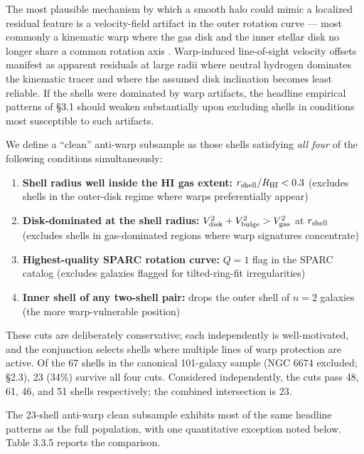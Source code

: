\documentclass[linenumbers,trackchanges]{aastex701}
\begin{document}
The most plausible mechanism by which a smooth halo could mimic a localized residual feature is a velocity-field artifact in the outer rotation curve --- most commonly a kinematic warp where the gas disk and the inner stellar disk no longer share a common rotation axis \citep{Briggs1990,Sancisi2008}. Warp-induced line-of-sight velocity offsets manifest as apparent residuals at large radii where neutral hydrogen dominates the kinematic tracer and where the assumed disk inclination becomes least reliable. If the shells were dominated by warp artifacts, the headline empirical patterns of \S3.1 should weaken substantially upon excluding shells in conditions most susceptible to such artifacts.

We define a ``clean'' anti-warp subsample as those shells satisfying \emph{all four} of the following conditions simultaneously:

\begin{enumerate}
  \item \textbf{Shell radius well inside the HI gas extent:} $r_{\rm shell} / R_{\rm HI} < 0.3$ (excludes shells in the outer-disk regime where warps preferentially appear)
  \item \textbf{Disk-dominated at the shell radius:} $V_{\rm disk}^2 + V_{\rm bulge}^2 > V_{\rm gas}^2$ at $r_{\rm shell}$ (excludes shells in gas-dominated regions where warp signatures concentrate)
  \item \textbf{Highest-quality SPARC rotation curve:} $Q = 1$ flag in the SPARC catalog (excludes galaxies flagged for tilted-ring-fit irregularities)
  \item \textbf{Inner shell of any two-shell pair:} drops the outer shell of $n = 2$ galaxies (the more warp-vulnerable position)
\end{enumerate}

These cuts are deliberately conservative; each independently is well-motivated, and the conjunction selects shells where multiple lines of warp protection are active. Of the 67 shells in the canonical 101-galaxy sample (NGC 6674 excluded; \S2.3), 23 (34\%) survive all four cuts. Considered independently, the cuts pass 48, 61, 46, and 51 shells respectively; the combined intersection is 23.

The 23-shell anti-warp clean subsample exhibits most of the same headline patterns as the full population, with one quantitative exception noted below. Table 3.3.5 reports the comparison.
\end{document}
